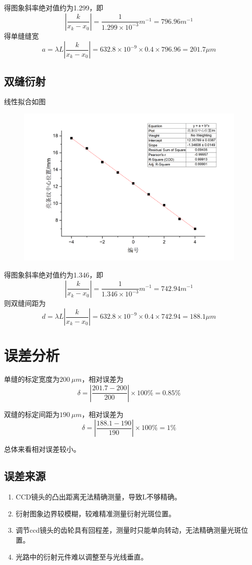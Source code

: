 \documentclass{article}
\begin{document}
    得图象斜率绝对值约为1.299，即\[\left|\frac{k}{x_k-x_0}\right|=\frac{1}{1.299\times 10^{-3}}m^{-1}=796.96m^{-1}\]
    得单缝缝宽
    \[a=\lambda L\left|\frac{k}{x_k-x_0}\right|=632.8\times10^{-9}\times0.4\times 796.96=201.7\mu m\]

\subsection*{双缝衍射}
线性拟合如图
    \begin{figure}[htbp]
        \centering
        \includegraphics[scale=0.35]{graph0.png}
    \end{figure}

    得图象斜率绝对值约为1.346，即\[\left|\frac{k}{x_k-x_0}\right|=\frac{1}{1.346\times 10^{-3}}m^{-1}=742.94m^{-1}\]
    则双缝间距为\[d=\lambda L\left|\frac{k}{x_k-x_0}\right|=632.8\times10^{-9}\times0.4\times 742.94=188.1\mu m\]

\section*{误差分析}


单缝的标定宽度为$\SI{200}{\mu m}$，相对误差为
\[\delta =\left|\frac{201.7-200}{200}\right|\times 100\%=0.85\%\]

双缝的标定间距为$\SI{190}{\mu m}$，相对误差为
\[\delta =\left|\frac{188.1-190}{190}\right|\times 100\%=1\%\]

总体来看相对误差较小。
\subsection*{误差来源}
\begin{enumerate}
    \item CCD镜头的凸出距离无法精确测量，导致L不够精确。
    \item 衍射图象边界较模糊，较难精准测量衍射光斑位置。
    \item 调节ccd镜头的齿轮具有回程差，测量时只能单向转动，无法精确测量光斑位置。
    \item 光路中的衍射元件难以调整至与光线垂直。
\end{enumerate}
\end{document}
